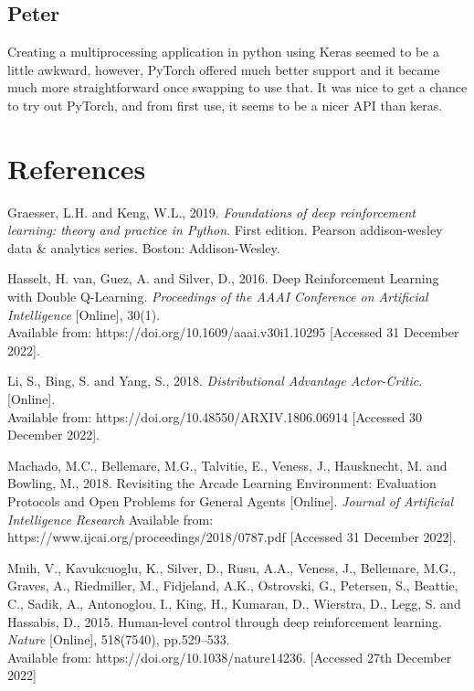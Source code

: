 \documentclass{article}
\begin{document}
\subsection{Peter}

Creating a multiprocessing application in python using Keras seemed to be a little awkward, however, PyTorch offered much better support and it became much more straightforward once swapping to use that. It was nice to get a chance to try out PyTorch, and from first use, it seems to be a nicer API than keras.

\section*{References}

\small 

Graesser, L.H. and Keng, W.L., 2019. \emph{Foundations of deep reinforcement learning: theory and practice in Python}. First edition. Pearson addison-wesley data \& analytics series. Boston: Addison-Wesley.

Hasselt, H. van, Guez, A. and Silver, D., 2016. Deep Reinforcement Learning with Double Q-Learning. \emph{Proceedings of the AAAI Conference on Artificial Intelligence} [Online], 30(1). \\
Available from: https://doi.org/10.1609/aaai.v30i1.10295 [Accessed 31 December 2022].

Li, S., Bing, S. and Yang, S., 2018. \emph{Distributional Advantage Actor-Critic}. [Online]. \\
Available from: https://doi.org/10.48550/ARXIV.1806.06914 [Accessed 30 December 2022].

Machado, M.C., Bellemare, M.G., Talvitie, E., Veness, J., Hausknecht, M. and Bowling, M., 2018. Revisiting the Arcade Learning Environment: Evaluation Protocols and Open Problems for General Agents [Online]. \emph{Journal of Artificial Intelligence Research}  Available from: https://www.ijcai.org/proceedings/2018/0787.pdf  [Accessed 31 December 2022].

Mnih, V., Kavukcuoglu, K., Silver, D., Rusu, A.A., Veness, J., Bellemare, M.G., Graves, A., Riedmiller, M., Fidjeland, A.K., Ostrovski, G., Petersen, S., Beattie, C., Sadik, A., Antonoglou, I., King, H., Kumaran, D., Wierstra, D., Legg, S. and Hassabis, D., 2015. Human-level control through deep reinforcement learning. \emph{Nature} [Online], 518(7540), pp.529–533. \\
Available from: https://doi.org/10.1038/nature14236. [Accessed 27th December 2022]
\end{document}
